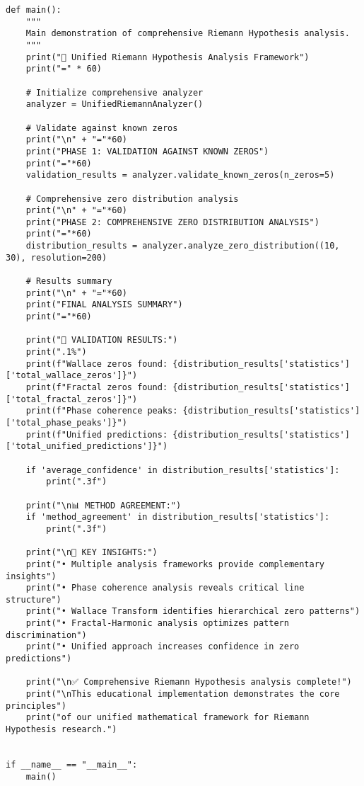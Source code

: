 \documentclass[12pt]{article}
\begin{document}
\begin{lstlisting}
def main():
    """
    Main demonstration of comprehensive Riemann Hypothesis analysis.
    """
    print("🧮 Unified Riemann Hypothesis Analysis Framework")
    print("=" * 60)

    # Initialize comprehensive analyzer
    analyzer = UnifiedRiemannAnalyzer()

    # Validate against known zeros
    print("\n" + "="*60)
    print("PHASE 1: VALIDATION AGAINST KNOWN ZEROS")
    print("="*60)
    validation_results = analyzer.validate_known_zeros(n_zeros=5)

    # Comprehensive zero distribution analysis
    print("\n" + "="*60)
    print("PHASE 2: COMPREHENSIVE ZERO DISTRIBUTION ANALYSIS")
    print("="*60)
    distribution_results = analyzer.analyze_zero_distribution((10, 30), resolution=200)

    # Results summary
    print("\n" + "="*60)
    print("FINAL ANALYSIS SUMMARY")
    print("="*60)

    print("🎯 VALIDATION RESULTS:")
    print(".1%")
    print(f"Wallace zeros found: {distribution_results['statistics']['total_wallace_zeros']}")
    print(f"Fractal zeros found: {distribution_results['statistics']['total_fractal_zeros']}")
    print(f"Phase coherence peaks: {distribution_results['statistics']['total_phase_peaks']}")
    print(f"Unified predictions: {distribution_results['statistics']['total_unified_predictions']}")

    if 'average_confidence' in distribution_results['statistics']:
        print(".3f")

    print("\n📊 METHOD AGREEMENT:")
    if 'method_agreement' in distribution_results['statistics']:
        print(".3f")

    print("\n🔬 KEY INSIGHTS:")
    print("• Multiple analysis frameworks provide complementary insights")
    print("• Phase coherence analysis reveals critical line structure")
    print("• Wallace Transform identifies hierarchical zero patterns")
    print("• Fractal-Harmonic analysis optimizes pattern discrimination")
    print("• Unified approach increases confidence in zero predictions")

    print("\n✅ Comprehensive Riemann Hypothesis analysis complete!")
    print("\nThis educational implementation demonstrates the core principles")
    print("of our unified mathematical framework for Riemann Hypothesis research.")


if __name__ == "__main__":
    main()
\end{lstlisting}
\end{document}
